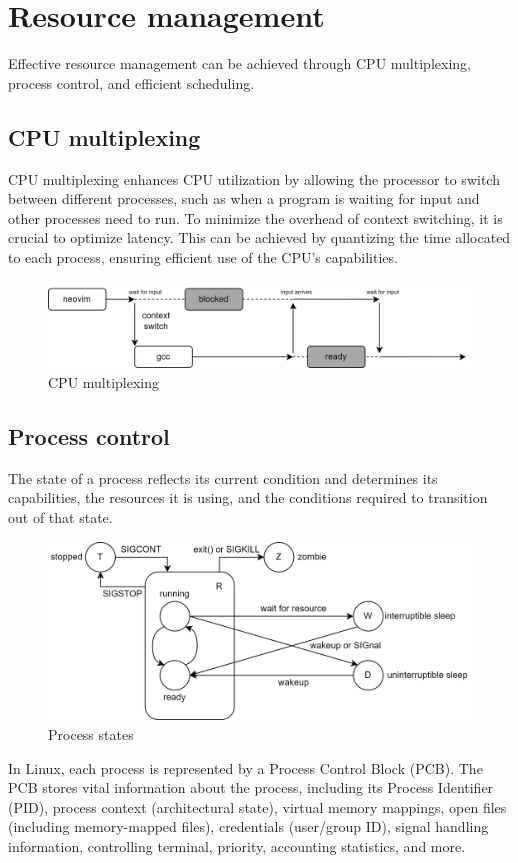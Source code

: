 \section{Resource management}

Effective resource management can be achieved through CPU multiplexing, process control, and efficient scheduling.

\subsection{CPU multiplexing}
CPU multiplexing enhances CPU utilization by allowing the processor to switch between different processes, such as when a program is waiting for input and other processes need to run. 
To minimize the overhead of context switching, it is crucial to optimize latency. 
This can be achieved by quantizing the time allocated to each process, ensuring efficient use of the CPU's capabilities.
\begin{figure}[H]
    \centering
    \includegraphics[width=0.75\linewidth]{images/mult.png}
    \caption{CPU multiplexing}
\end{figure}

\subsection{Process control}
The state of a process reflects its current condition and determines its capabilities, the resources it is using, and the conditions required to transition out of that state.
\begin{figure}[H]
    \centering
    \includegraphics[width=0.75\linewidth]{images/proc.png}
    \caption{Process states}
\end{figure}
In Linux, each process is represented by a Process Control Block (PCB).
The PCB stores vital information about the process, including its Process Identifier (PID), process context (architectural state), virtual memory mappings, open files (including memory-mapped files), credentials (user/group ID), signal handling information, controlling terminal, priority, accounting statistics, and more.

